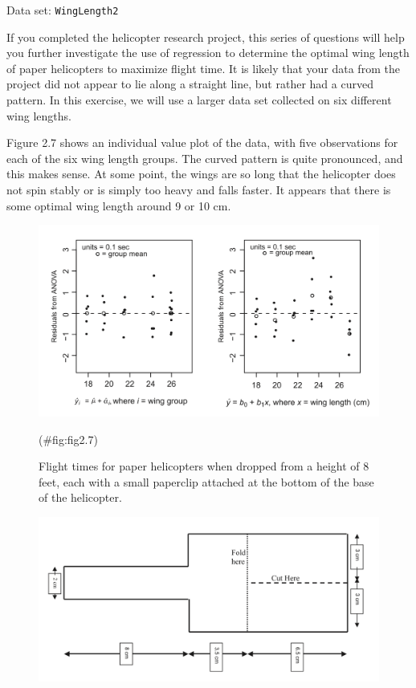 \documentclass[
]{report}
\begin{document}
\begin{list}{E..}{ \setlength{\itemsep}{1.2em}}
Data set: \texttt{WingLength2}

If you completed the helicopter research project, this series of questions will help you further investigate the use of regression to determine the optimal wing length of paper helicopters to maximize flight time. It is likely that your data from the project did not appear to lie along a straight line, but rather had a curved pattern. In this exercise, we will use a larger data set collected on six different wing lengths.

Figure 2.7 shows an individual value plot of the data, with five observations for each of the six wing length groups. The curved pattern is quite pronounced, and this makes sense. At some point, the wings are so long that the helicopter does not spin stably or is simply too heavy and falls faster. It appears that there is some optimal wing length around 9 or 10 cm.

\begin{figure}

{\centering \includegraphics[width=1\linewidth]{docs/Fig2_7} 

}

\caption{Flight times for paper helicopters when dropped from a height of 8 feet, each with a small paperclip attached at the bottom of the base of the helicopter.}(\#fig:fig2.7)
\end{figure}

\begin{figure}

{\centering \includegraphics[width=1\linewidth]{docs/Fig2_8} 

}
\end{figure}
\end{list}
\end{document}

